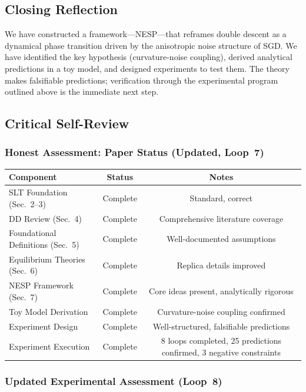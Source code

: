 \documentclass[
  journal=largetwo,
  simfonts=false,
  year=2025,
  volume=37,
]{cup-journal}
\begin{document}
\subsection{Closing Reflection}

We have constructed a framework---NESP---that reframes double descent as a dynamical phase transition driven by the anisotropic noise structure of SGD. We have identified the key hypothesis (curvature-noise coupling), derived analytical predictions in a toy model, and designed experiments to test them. The theory makes falsifiable predictions; verification through the experimental program outlined above is the immediate next step.

\subsection{Critical Self-Review}\label{app:self_review}

\subsubsection*{Honest Assessment: Paper Status (Updated, Loop~7)}

\begin{table}[htb]
\centering
\begin{tabular}{ lcc }
\toprule
\textbf{Component} & \textbf{Status} & \textbf{Notes} \\
\midrule
SLT Foundation (Sec.~2--3) & Complete & Standard, correct \\
DD Review (Sec.~4) & Complete & Comprehensive literature coverage \\
Foundational Definitions (Sec.~5) & Complete & Well-documented assumptions \\
Equilibrium Theories (Sec.~6) & Complete & Replica details improved \\
NESP Framework (Sec.~7) & Complete & Core ideas present, analytically rigorous \\
Toy Model Derivation & Complete & Curvature-noise coupling confirmed \\
Experiment Design & Complete & Well-structured, falsifiable predictions \\
Experiment Execution & Complete & 8 loops completed, 25 predictions confirmed, 3 negative constraints \\
\bottomrule
\end{tabular}
\end{table}

\subsubsection*{Updated Experimental Assessment (Loop~8)}
\end{document}
